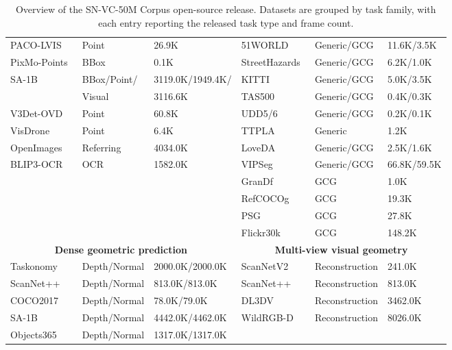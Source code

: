 \begin{table}[htb]
\begin{tabular}{p{}|p{}|p{}||p{}|p{}|p{}}
    PACO-LVIS~\cite{ramanathan2023paco} & Point & 26.9K & 51WORLD~\cite{51world_dataone_synthetic_2025} & Generic/GCG & 11.6K/3.5K \\
    PixMo-Points~\cite{Deitke2024MolmoAP} & BBox & 0.1K & StreetHazards~\cite{hendrycks2019anomalyseg} & Generic/GCG & 6.2K/1.0K \\
    SA-1B~\cite{sam} & BBox/Point/ & 3119.0K/1949.4K/ & KITTI~\cite{step_2021} & Generic/GCG & 5.0K/3.5K \\
    & Visual & 3116.6K & TAS500~\cite{metzger2021finegraineddatasetefficientsemantic} & Generic/GCG & 0.4K/0.3K \\
    V3Det-OVD~\cite{wang2023v3det} & Point & 60.8K & UDD5/6~\cite{chen2018large} & Generic/GCG & 0.2K/0.1K \\
    VisDrone~\cite{zhu2021detection} & Point & 6.4K & TTPLA~\cite{abdelfattah2020ttpla} & Generic & 1.2K \\
    OpenImages~\cite{OpenImages} & Referring & 4034.0K & LoveDA~\cite{Wang2021LoveDAAR} & Generic/GCG & 2.5K/1.6K \\
    BLIP3-OCR~\cite{Xue2024BLIP3AF} & OCR & 1582.0K & VIPSeg~\cite{miao2021vspw} & Generic/GCG & 66.8K/59.5K \\
    & & & GranDf~\cite{Rasheed_2024_CVPR} & GCG & 1.0K \\
    & & & RefCOCOg~\cite{kazemzadeh-etal-2014-referitgame} & GCG & 19.3K \\
    & & & PSG~\cite{yang2022psg} & GCG & 27.8K \\
    & & & Flickr30k~\cite{plummer2015flickr30k} & GCG & 148.2K \\
    \cmidrule{1-6}
    \multicolumn{3}{c||}{\textbf{Dense geometric prediction}} & \multicolumn{3}{c}{\textbf{Multi-view visual geometry}} \\
    \cmidrule(r){1-3}\cmidrule(l){4-6}
    Taskonomy~\cite{zamir2018taskonomydisentanglingtasktransfer} & Depth/Normal & 2000.0K/2000.0K & ScanNetV2~\cite{dai2017scannetrichlyannotated3dreconstructions} & Reconstruction & 241.0K \\
    ScanNet++~\cite{yeshwanth2023scannethighfidelitydataset3d} & Depth/Normal & 813.0K/813.0K & ScanNet++~\cite{yeshwanth2023scannethighfidelitydataset3d} & Reconstruction & 813.0K \\
    COCO2017~\cite{lin2015microsoftcococommonobjects} & Depth/Normal & 78.0K/79.0K & DL3DV~\cite{ling2023dl3dv10klargescalescenedataset} & Reconstruction & 3462.0K \\
    SA-1B~\cite{sam} & Depth/Normal & 4442.0K/4462.0K & WildRGB-D~\cite{xia2024rgbdobjectswildscaling} & Reconstruction & 8026.0K \\
    Objects365~\cite{shao2019objects365} & Depth/Normal & 1317.0K/1317.0K & & & \\
    \bottomrule
  \end{tabular}
  \caption{
    Overview of the SN-VC-50M Corpus open-source release.
    Datasets are grouped by task family, with each entry reporting the released task type and frame count.
  }
  \label{tab:open-source-datasets}
\end{table}

